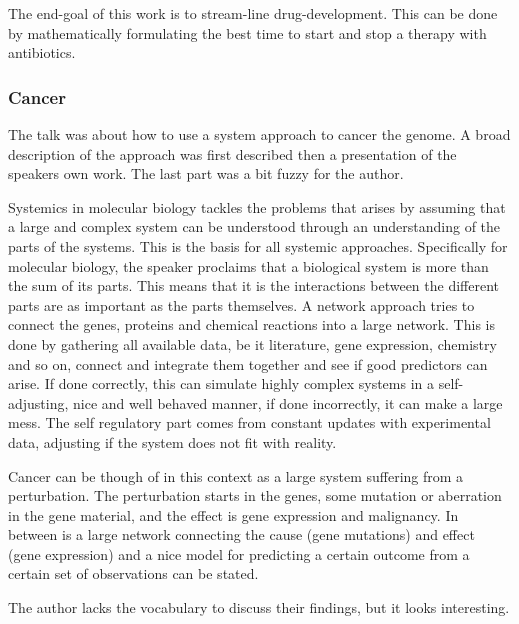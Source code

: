 \documentclass[12p]{article}
\begin{document}
The end-goal of this work is to stream-line drug-development.
This can be done by mathematically formulating the best time to start and stop a therapy with antibiotics.


\subsubsection*{Cancer}

The talk was about how to use a system approach to cancer the genome.
A broad description of the approach was first described then a presentation of the speakers own work.
The last part was a bit fuzzy for the author.

Systemics in molecular biology tackles the problems that arises by assuming that a large and complex system can be understood through an understanding of the parts of the systems.
This is the basis for all systemic approaches.
Specifically for molecular biology, the speaker proclaims that a biological system is more than the sum of its parts.
This means that it is the interactions between the different parts are as important as the parts themselves.
A network approach tries to connect the genes, proteins and chemical reactions into a large network.
This is done by gathering all available data, be it literature, gene expression, chemistry and so on, connect and integrate them together and see if good predictors can arise.
If done correctly, this can simulate highly complex systems in a self-adjusting, nice and well behaved manner, if done incorrectly, it can make a large mess.
The self regulatory part comes from constant updates with experimental data, adjusting if the system does not fit with reality.

Cancer can be though of in this context as a large system suffering from a perturbation.
The perturbation starts in the genes, some mutation or aberration in the gene material, and the effect is gene expression and malignancy.
In between is a large network connecting the cause (gene mutations) and effect (gene expression) and a nice model for predicting a certain outcome from a certain set of observations can be stated.

The author lacks the vocabulary to discuss their findings, but it looks interesting.






%
%
%
%
%
\end{document}
